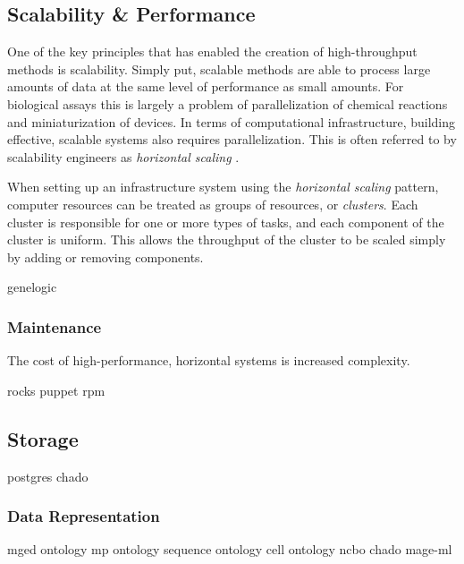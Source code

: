 {\subsection{Scalability \& Performance}
\label{Scalability}

One of the key principles that has enabled the creation of high-throughput
methods is scalability.  Simply put, scalable methods are able to process large
amounts of data at the same level of performance as small amounts.  For
biological assays this is largely a problem of parallelization of chemical
reactions and miniaturization of devices.  In terms of computational
infrastructure, building effective, scalable systems also requires
parallelization.  This is often referred to by scalability engineers as
\emph{horizontal scaling} \cite{schlossnagle2006,arlitt2001}.

When setting up an infrastructure system using the \emph{horizontal scaling}
pattern, computer resources can be treated as groups of resources, or
\emph{clusters}.  Each cluster is responsible for one or more types of tasks,
and each component of the cluster is uniform.  This allows the throughput of
the cluster to be scaled simply by adding or removing components.

genelogic		\cite{PMID_17059591}

\subsubsection{Maintenance}

The cost of high-performance, horizontal systems is increased complexity.

rocks		\cite{papadopoulos2003}
puppet		\cite{puppet}
rpm		\cite{bailey1997}

\subsection{Storage}

postgres	\cite{postgresql}
chado		\cite{PMID_17646315}

\subsubsection{Data Representation}

mged ontology		\cite{PMID_16428806}
mp ontology		\cite{PMID_15642099}
sequence ontology	\cite{PMID_15892872}
cell ontology		\cite{PMID_15693950}
ncbo			\cite{PMID_16901225}
chado			\cite{PMID_17646315}
mage-ml			\cite{PMID_12225585}

}
